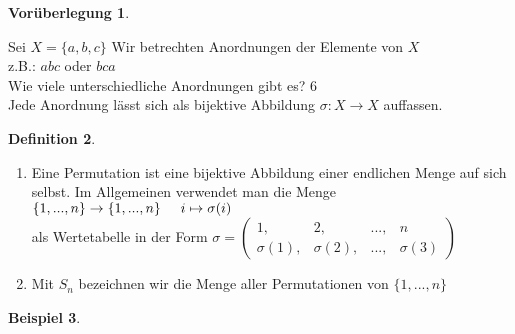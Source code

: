 \documentclass[a4paper,11pt]{article}
\newtheorem{definition}{Definition}[section]
\newtheorem{bsp}[definition]{Beispiel}
\newtheorem{vorue}[definition]{Vorüberlegung}
\begin{document}
\begin{vorue}
\end{vorue}
Sei $X=\{a,b,c\}$ Wir betrechten Anordnungen der Elemente von $X$ \\
z.B.: $abc$ oder $bca$ \\
Wie viele unterschiedliche Anordnungen gibt es? 6 \\
Jede Anordnung lässt sich als bijektive Abbildung $\sigma\colon X\rightarrow X$ auffassen.
\begin{definition}
\end{definition}
\begin{enumerate}[label=\alph*)]
\item Eine Permutation ist eine bijektive Abbildung einer endlichen Menge auf sich selbst. Im Allgemeinen verwendet man die Menge $\{1,...,n\}\rightarrow\{1,...,n\} \hspace{5mm}i\mapsto\sigma(i)$ \\
als Wertetabelle in der Form $\sigma = \begin{pmatrix}1, &2, &...,&n \\ \sigma(1),&\sigma(2),&...,&\sigma(3)\end{pmatrix}$
\item Mit $S_n$ bezeichnen wir die Menge aller Permutationen von $\{1,...,n\}$
\end{enumerate}
\begin{bsp}
\end{bsp}
\end{document}
